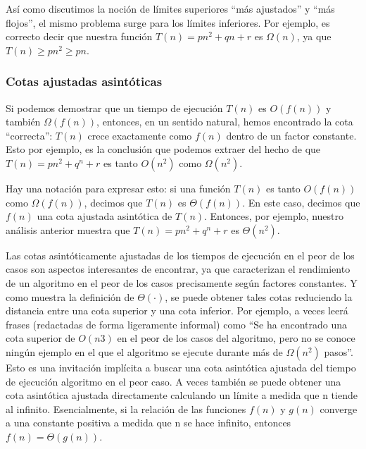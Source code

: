 \documentclass[a4paper, 12pt]{book}
\theoremstyle{dotless}
\begin{document}
Así como discutimos la noción de límites superiores ``más ajustados'' y ``más flojos'', el mismo problema surge para los límites inferiores. Por ejemplo, es correcto decir que nuestra función $T(n) = pn^2 + qn + r$ es $\Omega(n)$, ya que $T(n) \geq pn^2 \geq pn$.

\subsubsection*{Cotas ajustadas asintóticas}

Si podemos demostrar que un tiempo de ejecución $T(n)$ es $O(f(n))$ y también $\Omega(f(n))$, entonces, en un sentido natural, hemos encontrado la cota ``correcta'': $T(n)$ crece exactamente como $f(n)$ dentro de un factor constante. Esto por ejemplo, es la conclusión que podemos extraer del hecho de que $T(n) = pn^2 + q^n + r$ es tanto $O(n^2)$ como $\Omega(n^2)$.

Hay una notación para expresar esto: si una función $T(n)$ es tanto $O(f(n))$ como $\Omega(f (n))$, decimos que $T(n)$ es $\Theta(f(n))$. En este caso, decimos que $f(n)$ una cota ajustada asintótica de $T(n)$. Entonces, por ejemplo, nuestro análisis anterior muestra que $T (n) = pn^2 + q^n + r$ es $\Theta(n^2)$.

Las cotas asintóticamente ajustadas de los tiempos de ejecución en el peor de los casos son aspectos interesantes de encontrar, ya que caracterizan el rendimiento de un algoritmo en el peor de los casos precisamente según factores constantes.
Y como muestra la definición de $\Theta(\cdot)$, se puede obtener tales cotas reduciendo la distancia entre una cota superior y una cota inferior.  Por ejemplo, a veces leerá frases (redactadas de forma ligeramente informal) como ``Se ha encontrado una cota superior de $O(n3)$ en el peor de los casos del algoritmo, pero no se conoce ningún ejemplo en el que el algoritmo se ejecute durante más de $\Omega(n^2)$ pasos''. Esto es una invitación implícita a buscar una cota asintótica ajustada del tiempo de ejecución algoritmo en el peor caso. 
A veces también se puede obtener una cota asintótica ajustada directamente calculando un límite a medida que n tiende al infinito. Esencialmente, si la relación de las funciones $f(n)$ y $g(n)$ converge a una constante positiva a medida que n se hace infinito, entonces $f(n) = \Theta(g(n))$.
\end{document}
